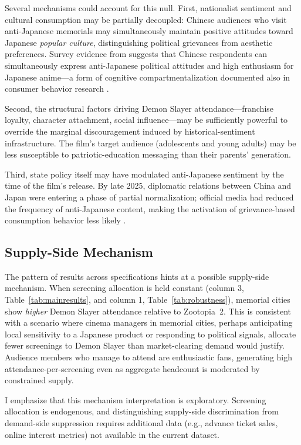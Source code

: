\documentclass[12pt]{article}
\begin{document}
Several mechanisms could account for this null. First, nationalist sentiment and cultural consumption may be partially decoupled: Chinese audiences who visit anti-Japanese memorials may simultaneously maintain positive attitudes toward Japanese \textit{popular culture}, distinguishing political grievances from aesthetic preferences. Survey evidence from \citet{bai2021} suggests that Chinese respondents can simultaneously express anti-Japanese political attitudes and high enthusiasm for Japanese anime---a form of cognitive compartmentalization documented also in consumer behavior research \citep{pandya2016}.

Second, the structural factors driving Demon Slayer attendance---franchise loyalty, character attachment, social influence---may be sufficiently powerful to override the marginal discouragement induced by historical-sentiment infrastructure. The film's target audience (adolescents and young adults) may be less susceptible to patriotic-education messaging than their parents' generation.

Third, state policy itself may have modulated anti-Japanese sentiment by the time of the film's release. By late 2025, diplomatic relations between China and Japan were entering a phase of partial normalization; official media had reduced the frequency of anti-Japanese content, making the activation of grievance-based consumption behavior less likely \citep{shirk2007}.

\subsection{Supply-Side Mechanism}
\label{sec:mechanism}

The pattern of results across specifications hints at a possible supply-side mechanism. When screening allocation is held constant (column 3, Table~\ref{tab:mainresults}, and column 1, Table~\ref{tab:robustness}), memorial cities show \textit{higher} Demon Slayer attendance relative to Zootopia~2. This is consistent with a scenario where cinema managers in memorial cities, perhaps anticipating local sensitivity to a Japanese product or responding to political signals, allocate fewer screenings to Demon Slayer than market-clearing demand would justify. Audience members who manage to attend are enthusiastic fans, generating high attendance-per-screening even as aggregate headcount is moderated by constrained supply.

I emphasize that this mechanism interpretation is exploratory. Screening allocation is endogenous, and distinguishing supply-side discrimination from demand-side suppression requires additional data (e.g., advance ticket sales, online interest metrics) not available in the current dataset.
\end{document}
